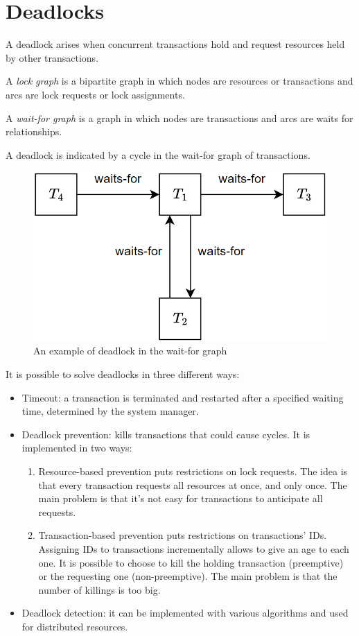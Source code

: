 \section{Deadlocks}

A deadlock arises when concurrent transactions hold and request resources held by other transactions.
\begin{definition}
    A \emph{lock graph} is a bipartite graph in which nodes are resources or transactions and arcs are lock requests or lock assignments. 

    A \emph{wait-for graph} is a graph in which nodes are transactions and arcs are waits for relationships. 
\end{definition}
A deadlock is indicated by a cycle in the wait-for graph of transactions.
\begin{figure}[H]
    \centering
    \includegraphics[width=0.35\linewidth]{images/waitgraph.png}
    \caption{An example of deadlock in the wait-for graph}
\end{figure}
It is possible to solve deadlocks in three different ways: 
\begin{itemize}
    \item Timeout: a transaction is terminated and restarted after a specified waiting time, determined by the system manager.
    \item Deadlock prevention: kills transactions that could cause cycles. 
        It is implemented in two ways: 
        \begin{enumerate}
            \item Resource-based prevention puts restrictions on lock requests. 
                The idea is that every transaction requests all resources at once, and only once. 
                The main problem is that it's not easy for transactions to anticipate all requests. 
            \item Transaction-based prevention puts restrictions on transactions' IDs. 
                Assigning IDs to transactions incrementally allows to give an age to each one. 
                It is possible to choose to kill the holding transaction (preemptive) or the requesting one (non-preemptive). 
                The main problem is that the number of killings is too big. 
        \end{enumerate}
    \item Deadlock detection: it can be implemented with various algorithms and used for distributed resources. 
\end{itemize}

